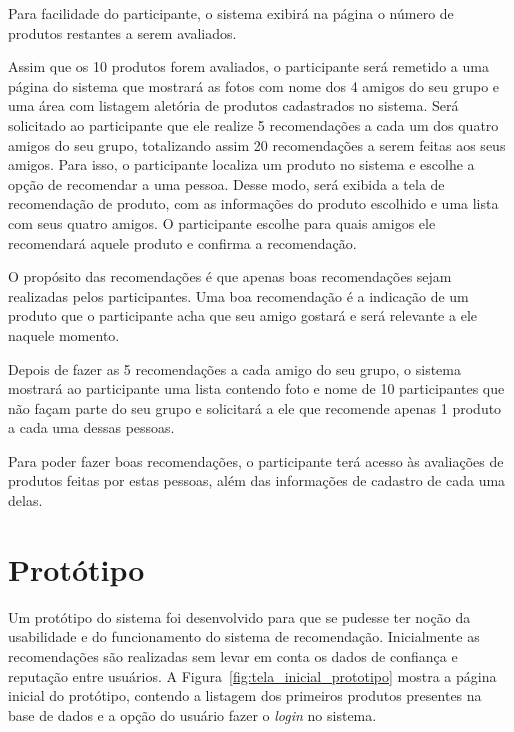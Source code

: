  Para facilidade do participante, o sistema exibirá na página o número de produtos restantes a serem avaliados.
 
 Assim que os 10 produtos forem avaliados, o participante será remetido a uma página do sistema que mostrará as fotos com nome dos 4 amigos do seu grupo e uma área com listagem aletória de produtos cadastrados no sistema. Será solicitado ao participante que ele realize 5 recomendações a cada um dos quatro amigos do seu grupo, totalizando assim 20 recomendações a serem feitas aos seus amigos. Para isso, o participante localiza um produto no sistema e escolhe a opção de recomendar a uma pessoa. Desse modo, será exibida a tela de recomendação de produto, com as informações do produto escolhido e uma lista com seus quatro amigos. O participante escolhe para quais amigos ele recomendará aquele produto e confirma a recomendação.
 
 O propósito das recomendações é que apenas boas recomendações sejam realizadas pelos participantes. Uma boa recomendação é a indicação de um produto que o participante acha que seu amigo gostará e será relevante a ele naquele momento.

 Depois de fazer as 5 recomendações a cada amigo do seu grupo, o sistema mostrará ao participante uma lista contendo foto e nome de 10 participantes que não façam parte do seu grupo e solicitará a ele que recomende apenas 1 produto a cada uma dessas pessoas.
 
 Para poder fazer boas recomendações, o participante terá acesso às avaliações de produtos feitas por estas pessoas, além das informações de cadastro de cada uma delas.

 \section{Protótipo}
 \label{cha:prototipo}

 Um protótipo do sistema foi desenvolvido para que se pudesse ter noção da usabilidade e do funcionamento do sistema de recomendação. Inicialmente as recomendações são realizadas sem levar em conta os dados de confiança e reputação entre usuários. A Figura~\ref{fig:tela_inicial_prototipo} mostra a página inicial do protótipo, contendo a listagem dos primeiros produtos presentes na base de dados e a opção do usuário fazer o \textit{login} no sistema.
 

